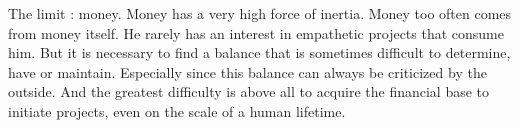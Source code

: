 The limit : money. Money has a very high force of inertia. Money too often comes from money itself. He rarely has an interest in empathetic projects that consume him. But it is necessary to find a balance that is sometimes difficult to determine, have or maintain. Especially since this balance can always be criticized by the outside. And the greatest difficulty is above all to acquire the financial base to initiate projects, even on the scale of a human lifetime.